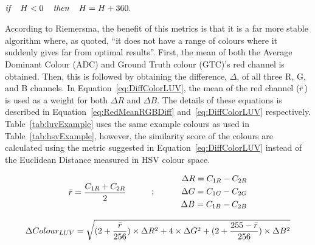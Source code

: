 \centerline{\\$\textit{if } \hspace{.8em}H< 0 \hspace{.8em}\textit{ then } \hspace{.8em}H = H+360.$}




According to Riemersma, the benefit of this metrics is that it is a far more stable algorithm where, as quoted, ``it does not have a range of colours where it suddenly gives far from optimal results''. First, the mean of both the Average Dominant Colour (ADC) and Ground Truth colour (GTC)'s red channel is obtained. Then, this is followed by obtaining the difference, $\Delta$, of all three R, G, and B channels.
In Equation~\ref{eq:DiffColorLUV}, the mean of the red channel ($\bar{r}$) is used as a weight for both $\Delta{R}$ and $\Delta{B}$. The details of these equations is described in Equation~\ref{eq:RedMeanRGBDiff} and~\ref{eq:DiffColorLUV} respectively. Table~\ref{tab:luvExample} uses the same example colours as used in Table~\ref{tab:hsvExample}, however, the similarity score of the colours are calculated using the metric suggested in Equation~\ref{eq:DiffColorLUV} instead of the Euclidean Distance measured in HSV colour space.

\begin{equation}
\begin{split}
\label{eq:RedMeanRGBDiff}
\bar{r} = \frac{C_{1R} + C_{2R}}{2}
\end{split}
\quad\quad\quad ; \quad\quad\quad
 \begin{split}
\Delta R = C_{1R} - C_{2R}\\
\Delta G = C_{1G} - C_{2G}\\
\Delta B = C_{1B} - C_{2B}
 \end{split}
\end{equation}

\begin{equation}
\label{eq:DiffColorLUV}
\Delta Colour_{LUV} = \sqrt{(2 + \frac{\bar{r}}{256}) \times \Delta R^{2} + 4 \times \Delta G^{2} + (2 + \frac{255 - \bar{r}}{256}) \times \Delta B^{2} }
\end{equation}




